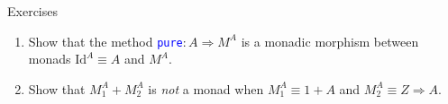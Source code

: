 \documentclass[english]{beamer}
\begin{document}
\begin{frame}{Exercises}
\begin{enumerate}
\item {\small{}Show that the method }\texttt{\textcolor{blue}{\footnotesize{}pure}}{\small{}$:A\Rightarrow M^{A}$
is a monadic morphism between monads $\text{Id}^{A}\equiv A$ and
$M^{A}$.}{\small\par}
\item {\small{}Show that $M_{1}^{A}+M_{2}^{A}$ is }\emph{\small{}not}{\small{}
a monad when $M_{1}^{A}\equiv1+A$ and $M_{2}^{A}\equiv Z\Rightarrow A$.}{\small\par}
\end{enumerate}
\end{frame}
\end{document}
